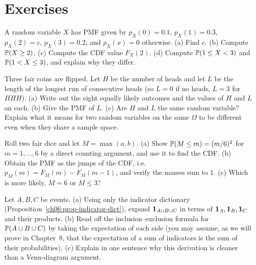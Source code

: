 \section{Exercises}
\label{ch06:exercises}

\begin{exercise}
\label{ch06:ex-read-pmf}
A random variable $X$ has PMF given by $p_X(0) = 0.1$, $p_X(1) = 0.3$,
$p_X(2) = c$, $p_X(3) = 0.2$, and $p_X(x) = 0$ otherwise.
(a) Find $c$. (b) Compute $\P(X \ge 2)$. (c) Compute the CDF value $F_X(2)$.
(d) Compute $\P(1 \le X < 3)$ and $\P(1 < X \le 3)$, and explain why they differ.
\end{exercise}

\begin{exercise}
\label{ch06:ex-build-rv}
Three fair coins are flipped. Let $H$ be the number of heads and let
$L$ be the length of the longest run of consecutive heads (so $L = 0$ if no heads,
$L=3$ for $HHH$). (a) Write out the eight equally likely outcomes and the values of
$H$ and $L$ on each. (b) Give the PMF of $L$. (c) Are $H$ and $L$ the same random
variable? Explain what it means for two random variables on the same $\Omega$ to be
different even when they share a sample space.
\end{exercise}

\begin{exercise}
\label{ch06:ex-max-dice}
Roll two fair dice and let $M = \max(a,b)$. (a) Show $\P(M \le m) = (m/6)^2$ for
$m = 1,\dots,6$ by a direct counting argument, and use it to find the CDF.
(b) Obtain the PMF as the jumps of the CDF, i.e.\ $p_M(m) = F_M(m) - F_M(m-1)$, and
verify the masses sum to $1$. (c) Which is more likely, $M = 6$ or $M \le 3$?
\end{exercise}

\begin{exercise}
\label{ch06:ex-indicator-algebra}
Let $A, B, C$ be events. (a) Using only the indicator dictionary
(Proposition~\ref{ch06:prop-indicator-dict}), expand $\ind_{A \cup B \cup C}$ in terms
of $\ind_A, \ind_B, \ind_C$ and their products. (b) Read off the inclusion--exclusion
formula for $\P(A \cup B \cup C)$ by taking the expectation of each side (you may
assume, as we will prove in Chapter~8, that the expectation of a sum of indicators is
the sum of their probabilities). (c) Explain in one sentence why this derivation is
cleaner than a Venn-diagram argument.
\end{exercise}

